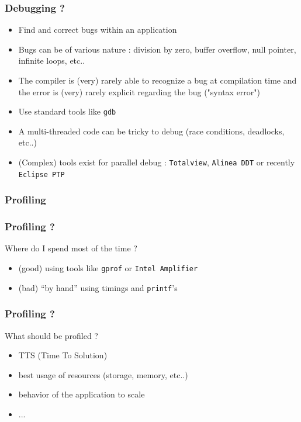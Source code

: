 \begin{frame}
	\frametitle{Debugging ?}

	\begin{itemize}
	\item Find and correct bugs within an application
	\item Bugs can be of various nature : division by zero, buffer overflow, null pointer, infinite loops, etc.. 
	\item The compiler is (very) rarely able to recognize a bug at compilation time and the error is (very) rarely explicit regarding the bug ("syntax error")
	\item Use standard tools like {\tt gdb} 
	\item A multi-threaded code can be tricky to debug (race conditions, deadlocks, etc..)
	\item (Complex) tools exist for parallel debug : {\tt Totalview}, {\tt Alinea DDT} or recently {\tt Eclipse PTP}
	\end{itemize}

\end{frame}


\subsubsection{Profiling}

\begin{frame}
	\frametitle{Profiling ?}

Where do I spend most of the time ? 

	\begin{itemize}
	\item (good) using tools like {\tt gprof} or {\tt Intel Amplifier}
	\item (bad) ``by hand'' using timings and {\tt printf}'s
	\end{itemize}
\end{frame}

\begin{frame}
	\frametitle{Profiling ?}

What should be profiled ?

	\begin{itemize}
	\item TTS (Time To Solution)
	\item best usage of resources (storage, memory, etc..)
	\item behavior of the application to scale
	\item ...
	\end{itemize}
\end{frame}



